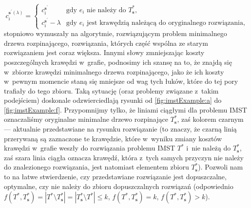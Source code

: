 \begin{equation}
	c^{\textbf{s}^{\prime} \left( \lambda \right)}_{i} = \left\{\begin{matrix}
		c^{\textbf{s}^{\prime}}_{i} & \text{gdy $e_{i}$ nie należy do $T^{\ast}_{\textbf{s}}$,}\\ 
		c^{\textbf{s}^{\prime}}_{i} - \lambda & \text{gdy $e_{i}$ jest krawędzią należącą do oryginalnego rozwiązania,}
	\end{matrix}\right.
\end{equation}
stopniowo wymuszały na algorytmie, rozwiązującym problem minimalnego drzewa rozpinającego, rozwiązania, których część wspólna ze starym rozwiązaniem jest coraz większa.
Innymi słowy zmniejszając koszty poszczególnych krawędzi w~grafie, podnosimy ich szansę na to, że znajdą się w~zbiorze krawędzi minimalnego drzewa rozpinającego, jako że ich koszty w~pewnym momencie staną się mniejsze od wag tych łuków, które do tej pory trafiały do tego zbioru.
Taką sytuację (oraz problemy związane z~takim podejściem) doskonale odzwierciedlają rysunki od \ref{fig:imstExample:a} do \ref{fig:imstExample:f}.
Przypomnijmy tylko, że liniami ciągłymi dla problemu \textsc{IMST} oznaczaliśmy oryginalne minimalne drzewo rozpinające $T^{\ast}_{\textbf{s}}$, zaś kolorem czarnym --- aktualnie przedstawiane na rysunku rozwiązanie (to znaczy, że czarną linią przerywaną są zaznaczone te krawędzie, które w~wyniku zmiany kosztów krawędzi w~grafie weszły do rozwiązania problemu \textsc{IMST} $T^{\ast}$ i~nie należą do $T^{\ast}_{\textbf{s}}$, zaś szara linia ciągła oznacza krawędź, która z~tych samych przyczyn nie należy do znalezionego rozwiązania, jest natomiast elementem zbioru $T^{\ast}_{\textbf{s}}$).
Pozwoli nam to na łatwe stwierdzenie, czy przedstawiane rozwiązanie jest dopuszczalne, optymalne, czy nie należy do zbioru dopuszczalnych rozwiązań (odpowiednio $f \left( T^{\ast}, T^{\ast}_{\textbf{s}} \right) = \left| T^{\ast} \setminus T^{\ast}_{\textbf{s}} \right| = \left| T^{\ast}_{\textbf{s}} \setminus T^{\ast} \right| \leqslant k$, $f \left( T^{\ast}, T^{\ast}_{\textbf{s}} \right) = k$, $f \left( T^{\ast}, T^{\ast}_{\textbf{s}} \right) > k$).

